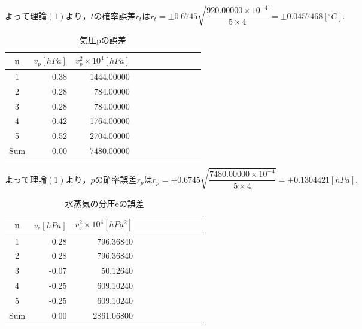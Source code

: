\documentclass[a4paper,1pt]{jsarticle}
\begin{document}
$よって理論(1)より，tの確率誤差r_tはr_t=\pm0.6745\sqrt{\dfrac{920.00000\times 10^{-4}}{5\times 4}}=\pm0.0457468[{}^\circ{C}].$\\

\begin{table}[H]
  \caption{気圧pの誤差}
  \label{table:SpeedOfLight}
  \centering
  \begin{tabular}{|c||r|r|r|r|r|r|r|r|r|r|}
    \hline
    n & $v_p[hPa]$ & $v_p^2\times 10^4[hPa]$ \\
    \hline\hline
    
    1 & 0.38 & 1444.00000 \\
    2 & 0.28 & 784.00000 \\
    3 & 0.28 & 784.00000 \\
    4 & -0.42 & 1764.00000 \\
    5 & -0.52 & 2704.00000 \\
    

   
    
    \hline\hline
    Sum & 0.00 & 7480.00000 \\
    \hline
  \end{tabular}


\end{table}

$よって理論(1)より，pの確率誤差r_pはr_p=\pm0.6745\sqrt{\dfrac{7480.00000\times 10^{-4}}{5\times 4}}=\pm0.1304421[hPa].$\\

\begin{table}[H]
  \caption{水蒸気の分圧eの誤差}
  \label{table:SpeedOfLight}
  \centering
  \begin{tabular}{|c||r|r|r|r|r|r|r|r|r|r|}
    \hline
    n & $v_e[hPa]$ & $v_e^2\times 10^4[hPa^2]$ \\
    \hline\hline
    
    1 & 0.28 & 796.36840 \\
    2 & 0.28 & 796.36840 \\
    3 & -0.07 & 50.12640 \\
    4 & -0.25 & 609.10240 \\
    5 & -0.25 & 609.10240 \\
    
   
    
    \hline\hline
    Sum & 0.00 & 2861.06800 \\
    \hline
  \end{tabular}


\end{table}
\end{document}
